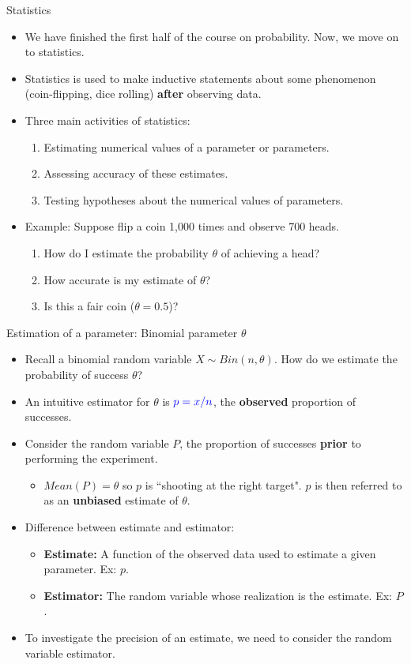 \documentclass[10pt, handout, xcolor=table]{beamer}
\begin{document}
\begin{frame}{Statistics}
\begin{itemize}\itemsep3ex
\item<1-> We have finished the first half of the course on {\color{blue} probability}. Now, we move on to {\color{blue} statistics}.
\item<2-> {\color{blue} Statistics} is used to make inductive statements about some phenomenon (coin-flipping, dice rolling) \textbf{after} observing data.
\item<3-> Three main activities of statistics:
\begin{enumerate}\itemsep1ex
\item Estimating numerical values of a parameter or parameters.
\item Assessing accuracy of these estimates.
\item Testing hypotheses about the numerical values of parameters.
\end{enumerate}
\item<4-> Example: Suppose flip a coin 1,000 times and observe 700 heads.
\begin{enumerate}\itemsep1ex
\item How do I estimate the probability $\theta$ of achieving a head?
\item How accurate is my estimate of $\theta$?
\item Is this a fair coin ($\theta = 0.5$)?
\end{enumerate}
\end{itemize}
\end{frame}

\begin{frame}{Estimation of a parameter: Binomial parameter $\theta$}
\begin{itemize}\itemsep3ex
\item<1-> Recall a binomial random variable $X \sim Bin(n, \theta)$. How do we estimate the probability of success $\theta$?
\item<2-> An intuitive estimator for $\theta$ is $\color{blue} p = x/n$, the \textbf{observed} proportion of successes.
\item<3-> Consider the random variable $P$, the proportion of successes \textbf{prior} to performing the experiment. 
\begin{itemize}
\item<4-> $Mean(P) = \theta$ so $p$ is ``shooting at the right target". $p$ is then referred to as an \textbf{unbiased} estimate of $\theta$.
\end{itemize}
\item<5-> Difference between estimate and estimator:
\begin{itemize}
\item \textbf{Estimate:} A function of the observed data used to estimate a given parameter. Ex: $p$.
\item \textbf{Estimator:} The random variable whose realization is the estimate. Ex: $P$.
\end{itemize}
\item<6-> To investigate the precision of an estimate, we need to consider the random variable estimator.
\end{itemize}
\end{frame}
\end{document}
